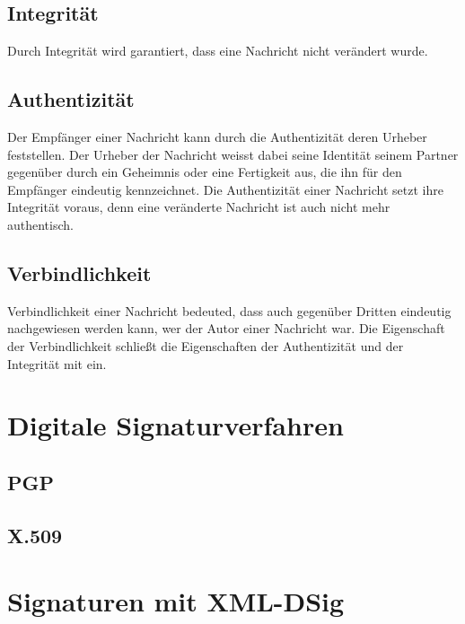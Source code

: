 \subsection{Integrität}
\label{sec:GrundlagenDefinitionen:DigitaleSignaturen:Integrität}
Durch Integrität wird garantiert, dass eine Nachricht nicht verändert wurde\cite{niag}.

\subsection{Authentizität}
\label{sec:GrundlagenDefinitionen:DigitaleSignaturen:Authentizität}
Der Empfänger einer Nachricht kann durch die Authentizität deren Urheber feststellen. Der Urheber der Nachricht weisst dabei seine Identität seinem
Partner gegenüber durch ein Geheimnis oder eine Fertigkeit aus, die ihn für den Empfänger eindeutig kennzeichnet. Die Authentizität einer Nachricht setzt ihre
Integrität voraus, denn eine veränderte Nachricht ist auch nicht mehr authentisch\cite{kits}.

\subsection{Verbindlichkeit}
\label{sec:GrundlagenDefinitionen:DigitaleSignaturen:Verbindlichkeit}
Verbindlichkeit einer Nachricht bedeuted, dass auch gegenüber Dritten eindeutig nachgewiesen werden kann, wer der Autor einer Nachricht war. Die Eigenschaft der
Verbindlichkeit schließt die Eigenschaften der Authentizität und der Integrität mit ein\cite{kits}.

\section{Digitale Signaturverfahren}
\label{sec:GrundlagenDefinitionen:DigitaleSignaturen:Verfahren}

\subsection{PGP}
\label{sec:GrundlagenDefinitionen:DigitaleSignaturen:Verfahren:pgp}

\subsection{X.509}
\label{sec:GrundlagenDefinitionen:DigitaleSignaturen:Verfahren:x509}

\section{Signaturen mit XML-DSig}
\label{sec:GrundlagenDefinitionen:xml-dsig}
